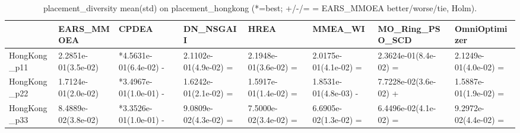 \begin{table}[t]
\centering
\caption{placement_diversity mean(std) on placement_hongkong (*=best; +/-/= = EARS_MMOEA better/worse/tie, Holm).}
\label{tab:placement_hongkong_placement_diversity}
\begin{tabular}{llllllll}
\toprule
 & EARS\_MMOEA & CPDEA & DN\_NSGAII & HREA & MMEA\_WI & MO\_Ring\_PSO\_SCD & OmniOptimizer \\
\midrule
HongKong\_p11 & 2.2851e-01(3.5e-02) & *4.5631e-01(6.4e-02) - & 2.1102e-01(4.9e-02) = & 2.1948e-01(3.6e-02) = & 2.0175e-01(4.1e-02) = & 2.3624e-01(8.4e-02) = & 2.1249e-01(4.0e-02) = \\
HongKong\_p22 & 1.7124e-01(2.0e-02) & *3.4967e-01(1.0e-01) - & 1.6242e-01(2.1e-02) = & 1.5917e-01(1.4e-02) = & 1.8531e-01(4.8e-03) - & 7.7228e-02(3.6e-02) + & 1.5887e-01(1.9e-02) = \\
HongKong\_p33 & 8.4889e-02(3.8e-02) & *3.3526e-01(1.0e-01) - & 9.0809e-02(4.3e-02) = & 7.5000e-02(3.4e-02) = & 6.6905e-02(1.3e-02) = & 6.4496e-02(4.1e-02) = & 9.2972e-02(4.4e-02) = \\
\bottomrule
\end{tabular}
\end{table}
